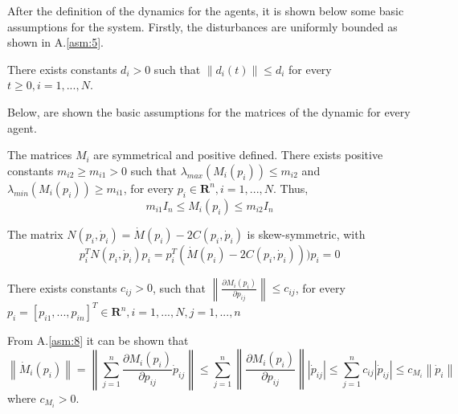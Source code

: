     After the definition of the dynamics for the agents, it is shown below some basic assumptions for the system. Firstly, the disturbances are uniformly bounded as shown in  A.\ref{asm:5}.
    
    \begin{assumption}\label{asm:5}
        There exists constants $d_i > 0$ such that $\left \lVert d_i(t) \right \rVert \leq d_i$ for every $t \geq 0, i = 1,...,N$.
    \end{assumption}
    
    Below, are shown the basic assumptions for the matrices of the dynamic for every agent.
    
    \begin{assumption}\label{asm:6}
        The matrices $M_i$ are symmetrical and positive defined. There exists positive constants $m_{i2} \geq m_{i1} > 0$ such that $\lambda_{max}(M_i(p_i)) \leq m_{i2}$ and $\lambda_{min}(M_i(p_i)) \geq m_{i1}$, for every $p_i \in \mathbf{R}^n, i = 1,...,N$. Thus,
        \begin{equation*}
            m_{i1}I_n \leq M_i(p_i) \leq m_{i2}I_n
        \end{equation*}
    \end{assumption}
    
    \begin{assumption}\label{asm:7}
        The matrix $N(p_i,\dot{p}_i) = \dot{M}(p_i) - 2C(p_i,\dot{p}_i)$ is skew-symmetric, with
        \begin{equation}\label{eq:4.1.4}
            p_i^TN(p_i,\dot{p}_i)p_i = p_i^T(\dot{M}(p_i) - 2C(p_i,\dot{p}_i)))p_i = 0
        \end{equation}
    \end{assumption}
    
    \begin{assumption}\label{asm:8}
        There exists constants $c_{ij} > 0$, such that $\left\lVert \frac{\partial M_i(p_i)}{\partial p_{ij}}\right\rVert \leq c_{ij}$, for every $p_i=[p_{i1},...,p_{in}]^T \in \mathbf{R}^n,i=1,...,N,j=1,...,n$
    \end{assumption}
    
    \begin{remark}\label{rem:4.1}
        From A.\ref{asm:8} it can be shown that
        \begin{equation}\label{eq:4.1.5}
            \left\lVert \dot{M}_i(p_i)\right \rVert = \left \lVert \sum_{j = 1}^{n} \frac{\partial M_i(p_i)}{\partial p_{ij}} \dot{p}_{ij} \right \rVert \leq \sum_{j = 1}^{n} \left \lVert \frac{\partial M_i(p_i)}{\partial p_{ij}}\right \rVert \left \lvert \dot{p}_{ij} \right \rvert \leq \sum_{j = 1}^{n} c_{ij} \left \lvert \dot{p}_{ij} \right \rvert \leq c_{M_i} \left \lVert \dot{p}_i \right \rVert
        \end{equation}
        where $c_{M_i} > 0$.
    \end{remark}
    

